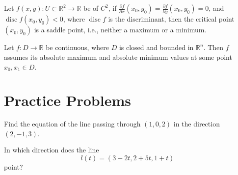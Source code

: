 \documentclass[openany]{book}
\newcommand{\R}{\mathbb{R}}
\DeclareMathOperator{\disc}{disc}
\begin{document}
\begin{prop}
    Let $f(x,y):U\subset\R^2\to \R$ be of  $C^2$, if $\frac{\partial f}{\partial x}(x_0,y_0)=\frac{\partial f}{\partial y}(x_0,y_0)=0$, and $\disc f(x_0,y_0)<0$, where $\disc f$ is the discriminant, then the critical point $(x_0,y_0)$ is a saddle point, i.e., neither a maximum or a minimum.
\end{prop}


\begin{prop}
    Let $f:D\to\R$ be continuous, where $D$ is closed and bounded in $\R^n$. Then $f$ assumes its absolute maximum and absolute minimum values at some point $x_0, x_1\in D$.
\end{prop}


















\chapter{Practice Problems}


\begin{prob}
    Find the equation of the line passing through $(1,0,2)$ in the direction $(2,-1,3)$.
\end{prob}

\begin{prob}
    In which direction does the line 
    \begin{equation*}
        l(t)=(3-2t, 2+5t, 1+t)
    \end{equation*}
    point?
\end{prob}
\end{document}
